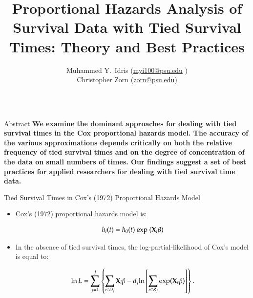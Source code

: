 \documentclass[structurebold,final,hyperref=pdftex,bookmarks,colorlinks,breaklinks]{beamer}
\title{Proportional Hazards Analysis of Survival Data with Tied Survival Times: Theory and Best Practices}
\author{Muhammed Y.\ Idris (\href{mailto:myi100@psu.edu}{myi100@psu.edu} )  \\  \vspace*{6pt} Christopher Zorn  (\href{mailto:zorn@psu.edu}{zorn@psu.edu})}
\institute{Pennsylvania State University}
\begin{document}
 

\begin{frame}
  \begin{columns}[t]

    \begin{column}{0.24\linewidth}

      \begin{block}{Abstract}
        {\bf We examine the dominant approaches for dealing with tied survival times in the Cox proportional hazards model. The accuracy of the various approximations depends critically on both the relative frequency of tied survival times and on the degree of concentration of the data on small numbers of times. Our findings suggest a set of best practices for applied researchers for dealing with tied survival time data. }
      \end{block}


      \begin{block}{Tied Survival Times in Cox's (1972) Proportional Hazards Model}
        \begin{itemize}
        \item Cox's (1972) proportional hazards model is:

        \begin{equation*}
            h_{i}(t) = h_{0}(t)~\text{exp}~({\bf X}_{i} \beta)
        \end{equation*}

        \item In the absence of tied survival times, the log-partial-likelihood of Cox's model is equal to:

        \begin{equation*}
            \ln L = \sum_{j=1}^{J} \left\{ \sum_{i \in D_{j}} {\bf X}_{i} \beta - d_{j} \text{ln} \left[ \sum_{r \in R_{j}} \text{exp}({\bf X}_{r} \beta) \right] \right\}.
        \end{equation*}


\end{itemize}
\end{block}
\end{column}
\end{columns}
\end{frame}
\end{document}

